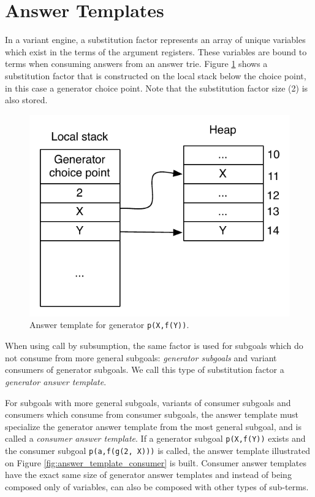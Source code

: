 \section{Answer Templates}

In a variant engine, a substitution factor
represents an array of unique variables which exist in the terms of the argument registers.
These variables are bound to terms when consuming answers from an answer trie.
Figure \ref{fig:answer_template_generator} shows a substitution factor that is constructed
on the local stack below the choice point, in this case a generator choice point.
Note that the substitution factor size (2) is also stored.

\begin{figure}[ht]
  \centering
    \includegraphics[scale=0.6]{answer_template_generator.pdf}
  \caption{Answer template for generator \texttt{p(X,f(Y))}.}
  \label{fig:answer_template_generator}
\end{figure}

When using call by subsumption, the same factor is used for
subgoals which do not consume from more general subgoals: \textit{generator subgoals}
and variant consumers of generator subgoals.
We call this type of substitution factor a \textit{generator answer template}.

For subgoals with more general subgoals, variants of consumer subgoals and consumers
which consume from consumer subgoals, the answer template must specialize the generator answer template
from the most general subgoal, and is called a \textit{consumer answer template}.
If a generator subgoal \texttt{p(X,f(Y))} exists and the consumer subgoal \texttt{p(a,f(g(2, X)))}
is called, the answer template illustrated on Figure \ref{fig:answer_template_consumer} is built.
Consumer answer templates have the exact same size of generator answer templates
and instead of being composed only of variables, can also be composed with other types of sub-terms.


